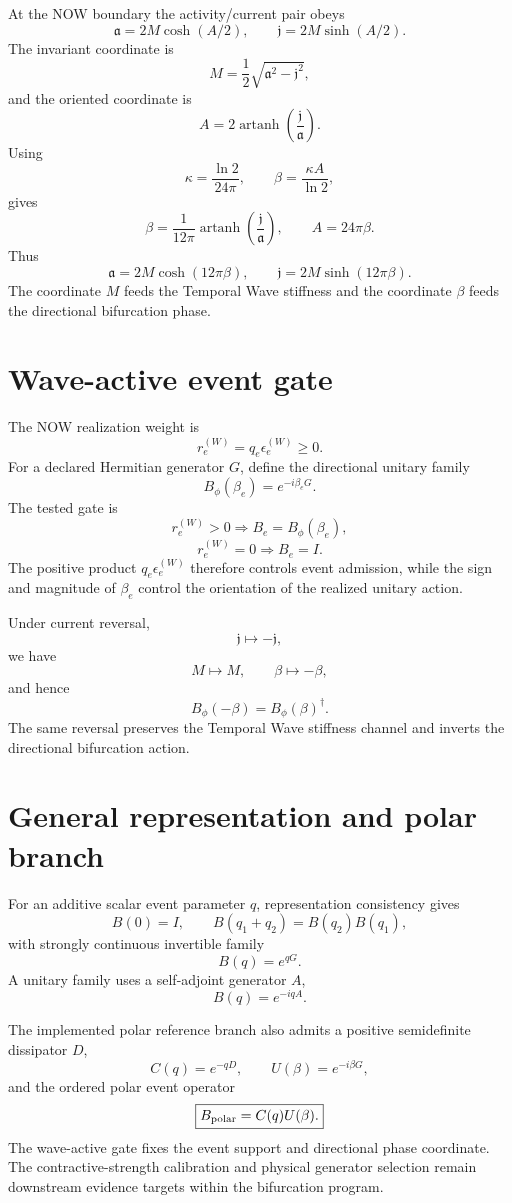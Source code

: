 \documentclass[11pt]{book}
\begin{document}
At the NOW boundary the activity/current pair obeys
\[
\mathfrak a=2M\cosh(A/2),
\qquad
\mathfrak j=2M\sinh(A/2).
\]
The invariant coordinate is
\[
\boxed{
M=\frac12\sqrt{\mathfrak a^2-\mathfrak j^2},
}
\]
and the oriented coordinate is
\[
A=2\operatorname{artanh}\!\left(\frac{\mathfrak j}{\mathfrak a}\right).
\]
Using
\[
\kappa=\frac{\ln2}{24\pi},
\qquad
\beta=\frac{\kappa A}{\ln2},
\]
gives
\[
\boxed{
\beta=\frac{1}{12\pi}
\operatorname{artanh}\!\left(\frac{\mathfrak j}{\mathfrak a}\right),
\qquad
A=24\pi\beta.
}
\]
Thus
\[
\boxed{
\mathfrak a=2M\cosh(12\pi\beta),
\qquad
\mathfrak j=2M\sinh(12\pi\beta).
}
\]
The coordinate $M$ feeds the Temporal Wave stiffness and the coordinate $\beta$ feeds the directional bifurcation phase.

\section{Wave-active event gate}

The NOW realization weight is
\[
r_e^{(W)}=q_e\epsilon_e^{(W)}\ge0.
\]
For a declared Hermitian generator $G$, define the directional unitary family
\[
B_\phi(\beta_e)=e^{-i\beta_eG}.
\]
The tested gate is
\[
\boxed{
r_e^{(W)}>0\Rightarrow B_e=B_\phi(\beta_e),}
\]
\[
\boxed{
r_e^{(W)}=0\Rightarrow B_e=I.}
\]
The positive product $q_e\epsilon_e^{(W)}$ therefore controls event admission, while the sign and magnitude of $\beta_e$ control the orientation of the realized unitary action.

Under current reversal,
\[
\mathfrak j\mapsto-\mathfrak j,
\]
we have
\[
M\mapsto M,
\qquad
\beta\mapsto-\beta,
\]
and hence
\[
\boxed{
B_\phi(-\beta)=B_\phi(\beta)^\dagger.
}
\]
The same reversal preserves the Temporal Wave stiffness channel and inverts the directional bifurcation action.

\section{General representation and polar branch}

For an additive scalar event parameter $q$, representation consistency gives
\[
B(0)=I,
\qquad
B(q_1+q_2)=B(q_2)B(q_1),
\]
with strongly continuous invertible family
\[
B(q)=e^{qG}.
\]
A unitary family uses a self-adjoint generator $A$,
\[
B(q)=e^{-iqA}.
\]

The implemented polar reference branch also admits a positive semidefinite dissipator $D$,
\[
C(q)=e^{-qD},
\qquad
U(\beta)=e^{-i\beta G},
\]
and the ordered polar event operator
\[
\boxed{
B_{\rm polar}=C(q)U(\beta).
}
\]
The wave-active gate fixes the event support and directional phase coordinate.  The contractive-strength calibration and physical generator selection remain downstream evidence targets within the bifurcation program.
\end{document}
